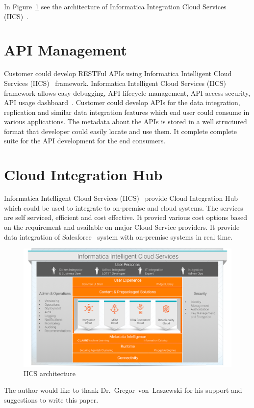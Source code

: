 In Figure~\ref{f:iics-products}\cite{hid-sp18-511-iics} see the
architecture of Informatica Integration Cloud Services
(IICS)~\cite{hid-sp18-511-iics}.

\section{API Management}

Customer could develop RESTFul APIs using Informatica Intelligent Cloud Services (IICS)~\cite{hid-sp18-511-iics} framework. Informatica Intelligent Cloud Services (IICS)~\cite{hid-sp18-511-iics} framework allows easy debugging, API lifecycle management, API access security, API usage dashboard~\cite{hid-sp18-511-iics-pricing}. Customer could develop APIs for the data integration, replication and similar data integration features which end user could consume in various applications. The metadata about the APIs is stored in a well structured format that developer could easily locate and use them. It complete complete suite for the API development for the end consumers.

\section{Cloud Integration Hub}
Informatica Intelligent Cloud Services (IICS)~\cite{hid-sp18-511-iics} provide Cloud Integration Hub~\cite{hid-sp18-511-iics-hub} which could be used to integrate to on-premise and cloud systems. The services are self serviced, efficient and cost effective. It provied various cost options based on the requirement and available on major Cloud Service providers. It provide data integration of Salesforce~\cite{hid-sp18-511-salesforce} system with on-premise systems in real time.

\begin{figure}[!ht]
	\centering\includegraphics[width=\columnwidth]{images/iics-diagram.png}
	\caption{IICS architecture}\label{f:iics-products}
\end{figure}

\begin{acks}

The author would like to thank Dr.~Gregor~von~Laszewski for his
support and suggestions to write this paper.

\end{acks}


 
